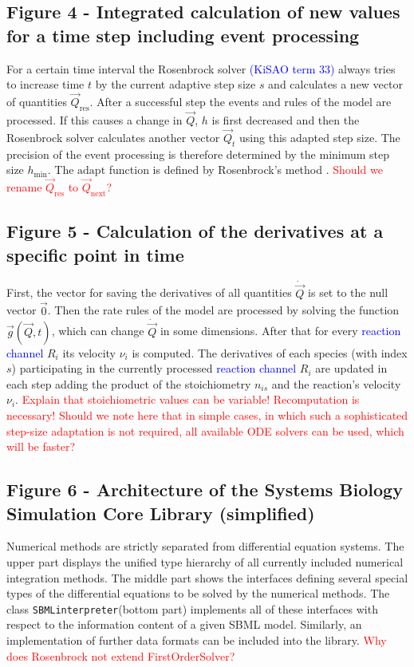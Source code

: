 \documentclass[10pt]{bmc_article}
\newenvironment{bmcformat}{\fussy\setboolean{publ}{true}}{\fussy}
\newcommand{\TODO}[1]{\textcolor{red}{#1}}
\newcommand{\COR}[1]{\textcolor{blue}{#1}}
\newcommand{\SBMLinterpreter}{\texttt{SBML\-interpreter}\xspace}
\begin{document}
\begin{bmcformat}
\subsection*{Figure 4 - Integrated calculation of new values for a time step including event processing}
For a certain time interval the Rosenbrock solver \COR{(\acs{KiSAO} term 33)} always tries to increase time $t$ by the current adaptive
step size $s$ and calculates a new vector of quantities $\vec{Q}_{\mathrm{res}}$.
After a successful step the events and rules of the model are processed.
If this causes a change in $\vec{Q}$, $h$ is first decreased and then the Rosenbrock solver calculates another vector $\vec{Q}_{t}$ using this adapted step size.
The precision of the event processing is therefore determined by the minimum step size $h_{\min}$.
The $\mathrm{adapt}$ function is defined by Rosenbrock's method \cite{Press1993}.
\TODO{Should we rename $\vec{Q}_{\mathrm{res}}$ to $\vec{Q}_{\mathrm{next}}$?}

\subsection*{Figure 5 - Calculation of the derivatives at a specific point in time}
First, the vector for saving the derivatives of all quantities $\dot{\vec{Q}}$ is set to the null vector $\vec{0}$.
Then the rate rules of the model are processed by solving the function $\vec{g}(\vec{Q}, t)$, which can change $\dot{\vec{Q}}$ in some dimensions.
After that for every \COR{reaction channel} $R_i$ its velocity $\nu_i$ is computed.
The derivatives of each species (with index $s$) participating in the currently processed \COR{reaction channel} $R_i$ are updated
in each step adding the product of the stoichiometry $n_{is}$ and the reaction's velocity $\nu_i$.
\TODO{Explain that stoichiometric values can be variable! Recomputation is necessary!}
\TODO{Should we note here that in simple cases, in which such a sophisticated step-size adaptation is not required, all available ODE solvers can be used, which will be faster?}

\subsection*{Figure 6 - Architecture of the Systems Biology Simulation Core Library (simplified)}
Numerical methods are strictly separated from differential equation systems. The
upper part displays the unified type hierarchy of all currently included numerical integration
methods. The middle part shows the interfaces defining several
special types of the differential equations to be solved by the numerical
methods.
The class \SBMLinterpreter (bottom part) implements all of these interfaces
with respect to the information content of a given \acs{SBML} model. Similarly, an
implementation of further data formats can be included into the
library.
\TODO{Why does Rosenbrock not extend FirstOrderSolver?}


\end{bmcformat}
\end{document}
